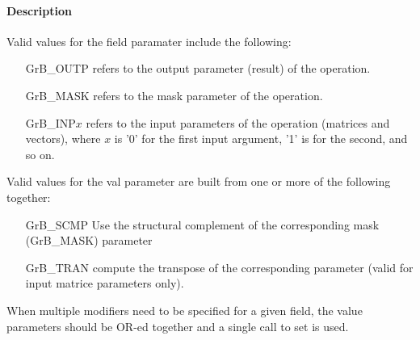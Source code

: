 \paragraph{Description}

Valid values for the {\sf field} paramater include the following:

\begin{itemize}[leftmargin=1.5in]
\item[{\sf GrB\_OUTP}]   refers to the output parameter (result) of the operation.
\item[{\sf GrB\_MASK}]   refers to the mask parameter of the operation.
\item[{\sf GrB\_INP}$x$] refers to the input parameters of the operation (matrices and vectors), 
                         where $x$ is '0' for the first input argument, '1' is for the second, and so on.
\end{itemize}

Valid values for the {\sf val} parameter are built from one or
more of the following together:

\begin{itemize}[leftmargin=1.5in]
\item[{\sf GrB\_SCMP}]   Use the structural complement of the corresponding mask
                         (GrB\_MASK) parameter
\item[{\sf GrB\_TRAN}]   compute the transpose of the corresponding parameter (valid
                         for input matrice parameters only).
\end{itemize}

When multiple modifiers need to be specified for a given field, the value parameters 
should be OR-ed together and a single call to set is used.  



